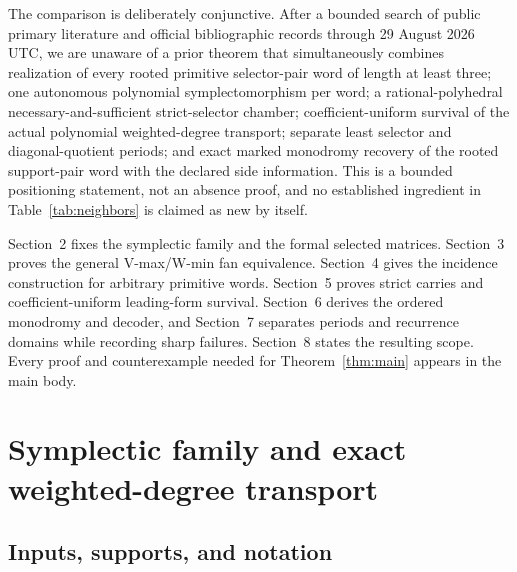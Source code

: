 \documentclass[11pt,letterpaper]{article}
\theoremstyle{definition}
\theoremstyle{remark}
\numberwithin{equation}{section}
\begin{document}
The comparison is deliberately conjunctive.  After a bounded search of
public primary literature and official bibliographic records through 29
August 2026 UTC, we are unaware of a prior theorem that simultaneously
combines realization of every rooted primitive selector-pair word of length
at least three; one autonomous polynomial symplectomorphism per word; a
rational-polyhedral necessary-and-sufficient strict-selector chamber;
coefficient-uniform survival of the actual polynomial weighted-degree
transport; separate least selector and diagonal-quotient periods; and exact
marked monodromy recovery of the rooted support-pair word with the declared
side information.  This is a bounded positioning statement, not an absence
proof, and no established ingredient in Table~\ref{tab:neighbors} is claimed
as new by itself.

Section~2 fixes the symplectic family and the formal selected matrices.
Section~3 proves the general V-max/W-min fan equivalence.  Section~4 gives
the incidence construction for arbitrary primitive words.  Section~5 proves
strict carries and coefficient-uniform leading-form survival.  Section~6
derives the ordered monodromy and decoder, and Section~7 separates periods
and recurrence domains while recording sharp failures.  Section~8 states
the resulting scope.  Every proof and counterexample needed for
Theorem~\ref{thm:main} appears in the main body.

\section{Symplectic family and exact weighted-degree transport}

\subsection{Inputs, supports, and notation}
\end{document}
